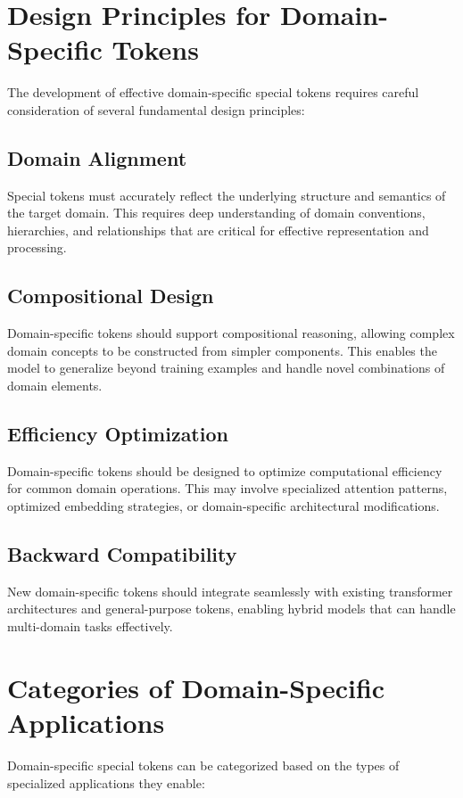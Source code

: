 \section{Design Principles for Domain-Specific Tokens}

The development of effective domain-specific special tokens requires careful consideration of several fundamental design principles:

\subsection{Domain Alignment}
Special tokens must accurately reflect the underlying structure and semantics of the target domain. This requires deep understanding of domain conventions, hierarchies, and relationships that are critical for effective representation and processing.

\subsection{Compositional Design}
Domain-specific tokens should support compositional reasoning, allowing complex domain concepts to be constructed from simpler components. This enables the model to generalize beyond training examples and handle novel combinations of domain elements.

\subsection{Efficiency Optimization}
Domain-specific tokens should be designed to optimize computational efficiency for common domain operations. This may involve specialized attention patterns, optimized embedding strategies, or domain-specific architectural modifications.

\subsection{Backward Compatibility}
New domain-specific tokens should integrate seamlessly with existing transformer architectures and general-purpose tokens, enabling hybrid models that can handle multi-domain tasks effectively.

\section{Categories of Domain-Specific Applications}

Domain-specific special tokens can be categorized based on the types of specialized applications they enable:

